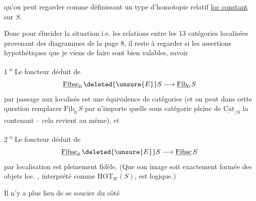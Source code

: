 qu'on peut regarder   comme définissant un type d'homotopie relatif \uline{loc constant} sur $S$.

Donc pour élucider la situation i.e. les relations entre les 13 catégories localisées provenant des diagrammes de la page 8, il reste à regarder si les assertions hypothétiques que je viens de faire sont bien valables, savoir

\textcircled{\scriptsize 1\textsuperscript{o}} Le foncteur déduit de
\[
 \underline{\mathrm{Fibsc}}_0\,\deleted{\unsure{E}}S\longrightarrow\underline{\mathrm{Fib}}_0\,S
\]
par passage aux localisés est une équivalence de catégories (et on peut dans cette question remplacer $\underline{\mathrm{Fib}}_0\,S$ par n'importe quelle  sous catégorie pleine de $\underline{\mathrm{Cat}}_{/S}$ la contenant -- cela revient au même), et

\textcircled{\scriptsize 2\textsuperscript{o}} Le foncteur déduit de
\[
 \underline{\mathrm{Fibsc}}_0\,\deleted{\unsure{E}}S\longrightarrow\underline{\mathrm{Fibsc}}\,S
\]
par localisation est pleinement fidèle. (Que son image  soit exactement formée des objets loc.   , interprété comme $\mathrm{HOT}_W(S)$, est  logique.)

Il n'y a plus lieu de se soucier du côté
